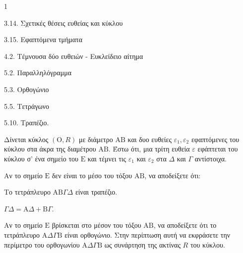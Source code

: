 \begin{ylh}{1}
    \item 3.14. Σχετικές θέσεις ευθείας και κύκλου
    \item 3.15. Εφαπτόμενα τμήματα
    \item 4.2. Τέμνουσα δύο ευθειών - Ευκλείδειο αίτημα
    \item 5.2. Παραλληλόγραμμα
    \item 5.3. Ορθογώνιο
    \item 5.5. Τετράγωνο
    \item 5.10. Τραπέζιο.
\end{ylh}
Δίνεται κύκλος $(\mathrm{O}, R)$ με διάμετρο $\mathrm{A}\mathrm{B}$ και δυο ευθείες $\varepsilon_1, \varepsilon_2$ εφαπτόμενες του κύκλου στα άκρα της διαμέτρου $\mathrm{A}\mathrm{B}$. Έστω ότι, μια τρίτη ευθεία $\varepsilon$ εφάπτεται του κύκλου σ' ένα σημείο του $\mathrm{E}$ και τέμνει τις $\varepsilon_1$ και $\varepsilon_2$ στα $\Delta$ και $\Gamma$ αντίστοιχα.
\begin{alist}
    \item Αν το σημείο $\mathrm{E}$ δεν είναι το μέσο του τόξου $\mathrm{A}\mathrm{B}$, να αποδείξετε ότι:
    \begin{rlist}
        \item Το τετράπλευρο $\mathrm{A}\mathrm{B}\Gamma\Delta$ είναι τραπέζιο. 
        \item $\Gamma\Delta = \mathrm{A}\Delta + \mathrm{B}\Gamma$. 
    \end{rlist}
    \item Αν το σημείο $\mathrm{E}$ βρίσκεται στο μέσον του τόξου $\mathrm{A}\mathrm{B}$, να αποδείξετε ότι το τετράπλευρο $\mathrm{A}\Delta\Gamma\mathrm{B}$ είναι ορθογώνιο. Στην περίπτωση αυτή να εκφράσετε την περίμετρο του ορθογωνίου $\mathrm{A}\Delta\Gamma\mathrm{B}$ ως συνάρτηση της ακτίνας $R$ του κύκλου. 
\end{alist}
